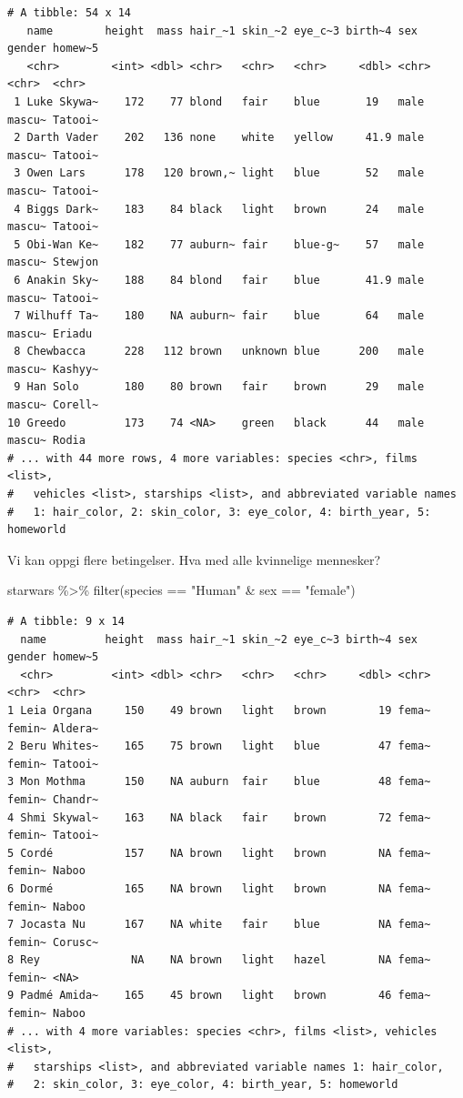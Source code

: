 \documentclass[
  letterpaper,
  DIV=11,
  numbers=noendperiod]{scrreprt}
\newenvironment{Shaded}{\begin{snugshade}}{\end{snugshade}}
\newcommand{\FunctionTok}[1]{\textcolor[rgb]{0.28,0.35,0.67}{#1}}
\newcommand{\NormalTok}[1]{\textcolor[rgb]{0.00,0.23,0.31}{#1}}
\newcommand{\SpecialCharTok}[1]{\textcolor[rgb]{0.37,0.37,0.37}{#1}}
\newcommand{\StringTok}[1]{\textcolor[rgb]{0.13,0.47,0.30}{#1}}
\begin{document}
\begin{verbatim}
# A tibble: 54 x 14
   name        height  mass hair_~1 skin_~2 eye_c~3 birth~4 sex   gender homew~5
   <chr>        <int> <dbl> <chr>   <chr>   <chr>     <dbl> <chr> <chr>  <chr>  
 1 Luke Skywa~    172    77 blond   fair    blue       19   male  mascu~ Tatooi~
 2 Darth Vader    202   136 none    white   yellow     41.9 male  mascu~ Tatooi~
 3 Owen Lars      178   120 brown,~ light   blue       52   male  mascu~ Tatooi~
 4 Biggs Dark~    183    84 black   light   brown      24   male  mascu~ Tatooi~
 5 Obi-Wan Ke~    182    77 auburn~ fair    blue-g~    57   male  mascu~ Stewjon
 6 Anakin Sky~    188    84 blond   fair    blue       41.9 male  mascu~ Tatooi~
 7 Wilhuff Ta~    180    NA auburn~ fair    blue       64   male  mascu~ Eriadu 
 8 Chewbacca      228   112 brown   unknown blue      200   male  mascu~ Kashyy~
 9 Han Solo       180    80 brown   fair    brown      29   male  mascu~ Corell~
10 Greedo         173    74 <NA>    green   black      44   male  mascu~ Rodia  
# ... with 44 more rows, 4 more variables: species <chr>, films <list>,
#   vehicles <list>, starships <list>, and abbreviated variable names
#   1: hair_color, 2: skin_color, 3: eye_color, 4: birth_year, 5: homeworld
\end{verbatim}

Vi kan oppgi flere betingelser. Hva med alle kvinnelige mennesker?

\begin{Shaded}
\begin{Highlighting}[]
\NormalTok{starwars }\SpecialCharTok{\%\textgreater{}\%} \FunctionTok{filter}\NormalTok{(species }\SpecialCharTok{==} \StringTok{"Human"} \SpecialCharTok{\&}\NormalTok{ sex }\SpecialCharTok{==} \StringTok{"female"}\NormalTok{)}
\end{Highlighting}
\end{Shaded}

\begin{verbatim}
# A tibble: 9 x 14
  name         height  mass hair_~1 skin_~2 eye_c~3 birth~4 sex   gender homew~5
  <chr>         <int> <dbl> <chr>   <chr>   <chr>     <dbl> <chr> <chr>  <chr>  
1 Leia Organa     150    49 brown   light   brown        19 fema~ femin~ Aldera~
2 Beru Whites~    165    75 brown   light   blue         47 fema~ femin~ Tatooi~
3 Mon Mothma      150    NA auburn  fair    blue         48 fema~ femin~ Chandr~
4 Shmi Skywal~    163    NA black   fair    brown        72 fema~ femin~ Tatooi~
5 Cordé           157    NA brown   light   brown        NA fema~ femin~ Naboo  
6 Dormé           165    NA brown   light   brown        NA fema~ femin~ Naboo  
7 Jocasta Nu      167    NA white   fair    blue         NA fema~ femin~ Corusc~
8 Rey              NA    NA brown   light   hazel        NA fema~ femin~ <NA>   
9 Padmé Amida~    165    45 brown   light   brown        46 fema~ femin~ Naboo  
# ... with 4 more variables: species <chr>, films <list>, vehicles <list>,
#   starships <list>, and abbreviated variable names 1: hair_color,
#   2: skin_color, 3: eye_color, 4: birth_year, 5: homeworld
\end{verbatim}
\end{document}
